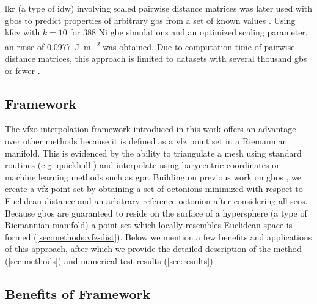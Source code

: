 \documentclass[preprint,12pt]{elsarticle}
\begin{document}
\Gls{lkr} (a type of \gls{idw}) involving scaled pairwise distance matrices was later used with \glspl{gbo} to predict properties of arbitrary \glspl{gb} from a set of known values \cite{chesserLearningGrainBoundary2020}. Using \gls{kfcv} with $k=10$ for \num{388} Ni \gls{gbe} simulations \cite{olmstedSurveyComputedGrain2009a} and an optimized scaling parameter, an \gls{rmse} of \SI{0.0977}{\J\per\square\meter} was obtained. Due to computation time of pairwise distance matrices, this approach is limited to datasets with several thousand \glspl{gb} or fewer \cite{chesserLearningGrainBoundary2020}.

\subsection{ Framework}
The \gls{vfzo} interpolation framework introduced in this work offers an advantage over other methods because it is defined as a \gls{vfz} point set in a Riemannian manifold. This is evidenced by the ability to triangulate a mesh using standard routines (e.g. quickhull \cite{barberQuickhullAlgorithmConvex1996}) and interpolate using barycentric coordinates or machine learning methods such as \gls{gpr}. Building on previous work on \glspl{gbo} \cite{francisGeodesicOctonionMetric2019,chesserLearningGrainBoundary2020}, we create a \gls{vfz} point set by obtaining a set of octonions minimized with respect to Euclidean distance and an arbitrary reference octonion after considering all \glspl{seo}. Because \glspl{gbo} are guaranteed to reside on the surface of a hypersphere \cite{francisGeodesicOctonionMetric2019} (a type of Riemannian manifold) a point set which locally resembles Euclidean space is formed (\cref{sec:methods:vfz-dist}). Below we mention a few benefits and applications of this approach, after which we provide the detailed description of the method (\cref{sec:methods}) and numerical test results (\cref{sec:results}).

\subsection{Benefits of  Framework}
\end{document}
